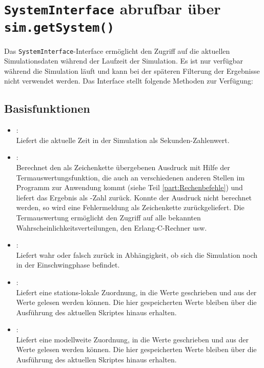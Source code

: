 \chapter{\texttt{SystemInterface} abrufbar über \texttt{sim.getSystem()}}

Das \texttt{SystemInterface}-Interface ermöglicht den Zugriff auf die aktuellen Simulationsdaten während
der Laufzeit der Simulation. Es ist nur verfügbar während die Simulation läuft und kann bei der
späteren Filterung der Ergebnisse nicht verwendet werden. Das Interface stellt folgende Methoden zur Verfügung:

\section{Basisfunktionen}

\begin{itemize}

\item
{}:\\
Liefert die aktuelle Zeit in der Simulation als Sekunden-Zahlenwert.

\item
{}:\\
Berechnet den als Zeichenkette übergebenen Ausdruck mit Hilfe der Termauswertungsfunktion, die
auch an verschiedenen anderen Stellen im Programm zur Anwendung kommt (siehe Teil \ref{part:Rechenbefehle}) und liefert das Ergebnis
als -Zahl zurück. Konnte der Ausdruck nicht berechnet werden, so wird eine Fehlermeldung als
Zeichenkette zurückgeliefert. Die Termauswertung ermöglicht den Zugriff auf alle bekannten
Wahrscheinlichkeitsverteilungen, den Erlang-C-Rechner usw.
  
\item
{}:\\
Liefert wahr oder falsch zurück in Abhängigkeit, ob sich die Simulation noch in der Einschwingphase befindet.

\item
{}:\\
Liefert eine stations-lokale Zuordnung, in die Werte geschrieben und aus der Werte gelesen werden können.
Die hier gespeicherten Werte bleiben über die Ausführung des aktuellen Skriptes hinaus erhalten.

\item
{}:\\
Liefert eine modellweite Zuordnung, in die Werte geschrieben und aus der Werte gelesen werden können.
Die hier gespeicherten Werte bleiben über die Ausführung des aktuellen Skriptes hinaus erhalten.

\end{itemize}

